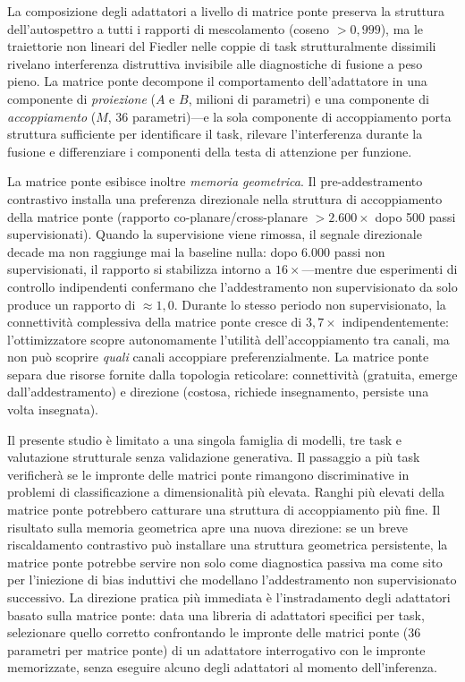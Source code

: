 \documentclass[11pt]{article}
\begin{document}
La composizione degli adattatori a livello di matrice ponte preserva la
struttura dell'autospettro a tutti i rapporti di mescolamento
(coseno $> 0{,}999$), ma le traiettorie non lineari del Fiedler nelle
coppie di task strutturalmente dissimili rivelano interferenza
distruttiva invisibile alle diagnostiche di fusione a peso pieno. La
matrice ponte decompone il comportamento dell'adattatore in una
componente di \emph{proiezione} ($A$ e $B$, milioni di parametri) e una
componente di \emph{accoppiamento} ($M$, 36 parametri)---e la sola
componente di accoppiamento porta struttura sufficiente per identificare
il task, rilevare l'interferenza durante la fusione e differenziare i
componenti della testa di attenzione per funzione.

La matrice ponte esibisce inoltre \emph{memoria geometrica}. Il
pre-addestramento contrastivo installa una preferenza direzionale nella
struttura di accoppiamento della matrice ponte (rapporto
co-planare/cross-planare $> 2.600\times$ dopo 500 passi
supervisionati). Quando la supervisione viene rimossa, il segnale
direzionale decade ma non raggiunge mai la baseline nulla: dopo 6.000
passi non supervisionati, il rapporto si stabilizza intorno a
$16\times$---mentre due esperimenti di controllo indipendenti confermano
che l'addestramento non supervisionato da solo produce un rapporto di
$\approx 1{,}0$.
Durante lo stesso periodo non supervisionato, la connettivit\`a
complessiva della matrice ponte cresce di $3{,}7\times$
indipendentemente: l'ottimizzatore scopre autonomamente l'utilit\`a
dell'accoppiamento tra canali, ma non pu\`o scoprire \emph{quali}
canali accoppiare preferenzialmente. La matrice ponte separa due risorse
fornite dalla topologia reticolare: connettivit\`a (gratuita, emerge
dall'addestramento) e direzione (costosa, richiede insegnamento,
persiste una volta insegnata).

Il presente studio \`e limitato a una singola famiglia di modelli, tre
task e valutazione strutturale senza validazione generativa. Il
passaggio a pi\`u task verificher\`a se le impronte delle matrici ponte
rimangono discriminative in problemi di classificazione a dimensionalit\`a
pi\`u elevata. Ranghi pi\`u elevati della matrice ponte potrebbero
catturare una struttura di accoppiamento pi\`u fine. Il risultato sulla
memoria geometrica apre una nuova direzione: se un breve riscaldamento
contrastivo pu\`o installare una struttura geometrica persistente, la
matrice ponte potrebbe servire non solo come diagnostica passiva ma come
sito per l'iniezione di bias induttivi che modellano l'addestramento non
supervisionato successivo. La direzione pratica pi\`u immediata \`e
l'instradamento degli adattatori basato sulla matrice ponte: data una
libreria di adattatori specifici per task, selezionare quello corretto
confrontando le impronte delle matrici ponte (36 parametri per matrice
ponte) di un
adattatore interrogativo con le impronte memorizzate, senza eseguire
alcuno degli adattatori al momento dell'inferenza.
\end{document}

